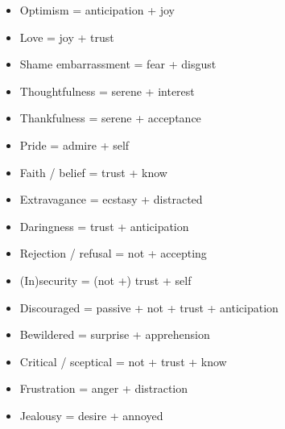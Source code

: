 \begin{itemize}
\item   Optimism = anticipation + joy 

\item   Love = joy + trust 

\item   Shame embarrassment = fear + disgust 

\item   Thoughtfulness = serene + interest 

\item   Thankfulness = serene + acceptance 

\item   Pride = admire + self 

\item   Faith / belief = trust + know 

\item   Extravagance = ecstasy + distracted 

\item   Daringness = trust + anticipation 

\item   Rejection / refusal = not + accepting 

\item   (In)security = (not +) trust + self  

\item   Discouraged = passive + not + trust + anticipation 

\item   Bewildered = surprise + apprehension 

\item   Critical / sceptical = not + trust + know  

\item   Frustration = anger + distraction  

\item   Jealousy = desire + annoyed 

\end{itemize}


